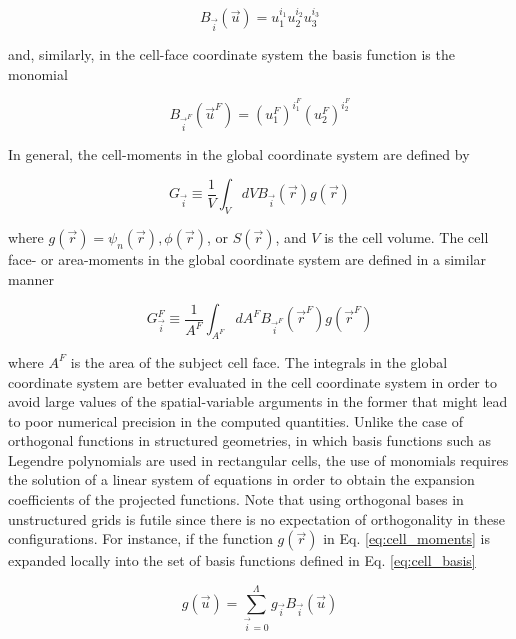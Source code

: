 \begin{equation} \label{eq:cell_basis}
    B_{\vec{i}} (\vec{u}) = u_1^{i_1} u_2^{i_2} u_3^{i_3}
\end{equation}

and, similarly, in the cell-face coordinate system the basis function is the monomial

\begin{equation} \label{eq:face_basis}
    B_{\vec{i}^F} (\vec{u}^F) = ( u_1^F )^{i_1^F} ( u_2^F )^{i_2^F}
\end{equation}

In general, the cell-moments in the global coordinate system are defined by

\begin{equation} \label{eq:cell_moments}
    G_{\vec{i}} \equiv \frac{1}{V} \int_{V} dV B_{\vec{i}} (\vec{r}) g(\vec{r})
\end{equation}

\noindent where $g( \vec{r} ) = \psi_n (\vec{r} ), \phi ( \vec{r} )$, or $S( \vec{r})$, and $V$ is the cell volume.
The cell face- or area-moments in the global coordinate system are defined in a similar manner

\begin{equation} \label{eq:face_moments}
    G_{\vec{i}}^F \equiv \frac{1}{A^F} \int_{A^F} dA^F B_{\vec{i}^F} (\vec{r}^F) g(\vec{r}^F)
\end{equation}

\noindent where $A^F$ is the area of the subject cell face.
The integrals in the global coordinate system are better evaluated in the cell coordinate system in order to avoid large values of the spatial-variable arguments in the former that might lead to poor numerical precision in the computed quantities.
Unlike the case of orthogonal functions in structured geometries, in which basis functions such as Legendre polynomials are used in rectangular cells, the use of monomials requires the solution of a linear system of equations in order to obtain the expansion coefficients of the projected functions.
Note that using orthogonal bases in unstructured grids is futile since there is no expectation of orthogonality in these configurations.
For instance, if the function $g( \vec{r}) $ in Eq. \ref{eq:cell_moments} is expanded locally into the set of basis functions defined in Eq. \ref{eq:cell_basis}

\begin{equation} \label{eq:g_expansion}
    g (\vec{u}) = \sum_{\vec{i}=0}^{\Lambda} g_{\vec{i}} B_{\vec{i}} (\vec{u})
\end{equation}

